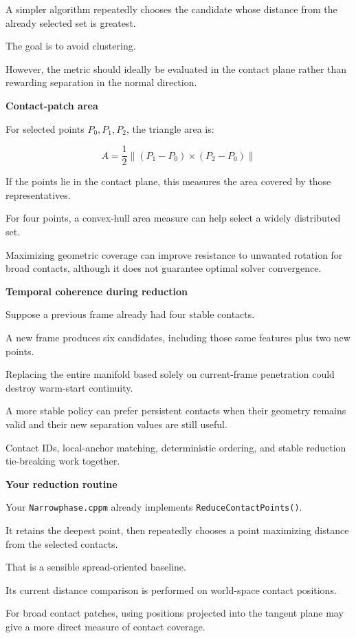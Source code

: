 A simpler algorithm repeatedly chooses the candidate whose distance from the already selected set is greatest.

The goal is to avoid clustering.

However, the metric should ideally be evaluated in the contact plane rather than rewarding separation in the normal direction.

\textbf{Contact-patch area}

For selected points \(P_0,P_1,P_2\), the triangle area is:

\[
\boxed{ A=\frac12 \|(P_1-P_0)\times(P_2-P_0)\| }
\]

If the points lie in the contact plane, this measures the area covered by those representatives.

For four points, a convex-hull area measure can help select a widely distributed set.

Maximizing geometric coverage can improve resistance to unwanted rotation for broad contacts, although it does not guarantee optimal solver convergence.

\textbf{Temporal coherence during reduction}

Suppose a previous frame already had four stable contacts.

A new frame produces six candidates, including those same features plus two new points.

Replacing the entire manifold based solely on current-frame penetration could destroy warm-start continuity.

A more stable policy can prefer persistent contacts when their geometry remains valid and their new separation values are still useful.

Contact IDs, local-anchor matching, deterministic ordering, and stable reduction tie-breaking work together.

\textbf{Your reduction routine}

Your \texttt{Narrowphase.cppm} already implements \texttt{ReduceContactPoints()}.

It retains the deepest point, then repeatedly chooses a point maximizing distance from the selected contacts.

That is a sensible spread-oriented baseline.

Its current distance comparison is performed on world-space contact positions.

For broad contact patches, using positions projected into the tangent plane may give a more direct measure of contact coverage.

